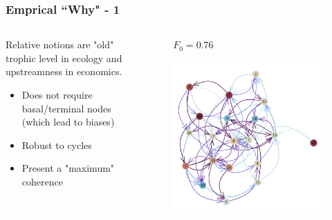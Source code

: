 \documentclass{beamer}
\begin{document}
\begin{frame}
\begin{columns}
\begin{column}{.49\textwidth}
\begin{figure}
            \end{figure}
        \end{column}
    \end{columns}
\end{frame}

\begin{frame}
    \frametitle{Emprical ``Why" - 1}
    \begin{columns}
        \begin{column}{.49\textwidth}
            Relative notions are "old" trophic level in ecology
            and upstreamness in economics.
            \begin{itemize}
                \item Does not require basal/terminal nodes (which lead to biases)
                \item Robust to cycles
                \item Present a "maximum" coherence
            \end{itemize}
        \end{column}
        \begin{column}{.49\textwidth}
            \begin{figure}
                \textbf{$F_0 = 0.76$}\par\medskip
                \includegraphics[width=\linewidth,height=\textheight,keepaspectratio]{../../plots/random/lv-network-big.png}
            \end{figure}
        \end{column}
    \end{columns}
\end{frame}
\end{document}
